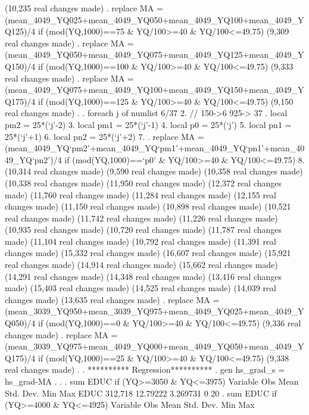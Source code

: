 (10,235 real changes made)
{\smallskip}
. replace MA = (mean_4049_YQ025+mean_4049_YQ050+mean_4049_YQ100+mean_4049_YQ125)/4 if (mod(YQ,1000)==75 \& YQ/100>=40 \& YQ/100<=49.75)
(9,309 real changes made)
{\smallskip}
. replace MA = (mean_4049_YQ050+mean_4049_YQ075+mean_4049_YQ125+mean_4049_YQ150)/4 if (mod(YQ,1000)==100 \& YQ/100>=40 \& YQ/100<=49.75)
(9,333 real changes made)
{\smallskip}
. replace MA = (mean_4049_YQ075+mean_4049_YQ100+mean_4049_YQ150+mean_4049_YQ175)/4 if (mod(YQ,1000)==125 \& YQ/100>=40 \& YQ/100<=49.75)
(9,150 real changes made)
{\smallskip}
. 
. foreach j of numlist 6/37{\lbr}
  2.         // 150->6 925-> 37
.         local pm2 = 25*(`j'-2)
  3.         local pm1 = 25*(`j'-1)
  4.         local p0 = 25*(`j')
  5.         local pn1 = 25*(`j'+1)
  6.         local pn2 = 25*(`j'+2)
  7. 
.         replace MA = (mean_4049_YQ`pm2'+mean_4049_YQ`pm1'+mean_4049_YQ`pn1'+mean_4049_YQ`pn2')/4 if (mod(YQ,1000)==`p0' \& YQ/100>=40 \& YQ/100<=49.75)
  8. {\rbr}
(10,314 real changes made)
(9,590 real changes made)
(10,358 real changes made)
(10,338 real changes made)
(11,950 real changes made)
(12,372 real changes made)
(11,760 real changes made)
(11,284 real changes made)
(12,155 real changes made)
(11,150 real changes made)
(10,898 real changes made)
(10,521 real changes made)
(11,742 real changes made)
(11,226 real changes made)
(10,935 real changes made)
(10,720 real changes made)
(11,787 real changes made)
(11,104 real changes made)
(10,792 real changes made)
(11,391 real changes made)
(15,332 real changes made)
(16,607 real changes made)
(15,921 real changes made)
(14,914 real changes made)
(15,662 real changes made)
(14,291 real changes made)
(14,348 real changes made)
(13,416 real changes made)
(15,403 real changes made)
(14,525 real changes made)
(14,039 real changes made)
(13,635 real changes made)
{\smallskip}
. replace MA = (mean_3039_YQ950+mean_3039_YQ975+mean_4049_YQ025+mean_4049_YQ050)/4 if (mod(YQ,1000)==0 \& YQ/100>=40 \& YQ/100<=49.75)
(9,336 real changes made)
{\smallskip}
. replace MA = (mean_3039_YQ975+mean_4049_YQ000+mean_4049_YQ050+mean_4049_YQ175)/4 if (mod(YQ,1000)==25 \& YQ/100>=40 \& YQ/100<=49.75)
(9,338 real changes made)
{\smallskip}
. 
. **********  Regression**********
. gen hs_grad_s = hs_grad-MA
{\smallskip}
. 
. 
. sum EDUC if (YQ>=3050 \& YQ<=3975)
{\smallskip}
    Variable {\VBAR}        Obs        Mean    Std. Dev.       Min        Max
        EDUC {\VBAR}    312,718    12.79222    3.269731          0         20
{\smallskip}
. sum EDUC if (YQ>=4000 \& YQ<=4925)
{\smallskip}
    Variable {\VBAR}        Obs        Mean    Std. Dev.       Min        Max
